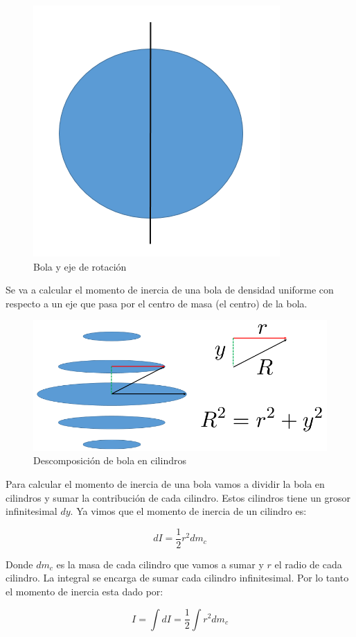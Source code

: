 \documentclass[a4paper,11pt]{article}
\theoremstyle{mytheor}
\begin{document}
\begin{figure}[h]
	\includegraphics[width=0.5\linewidth]{bola1}
	\caption{Bola y eje de rotación}
	\label{fcN4}
\end{figure}

Se va a calcular el momento de inercia de una bola de densidad uniforme con respecto a un eje que pasa por el centro de masa (el centro) de la bola.


\begin{figure}[h]
	\includegraphics[width=1\linewidth]{bola}
	\caption{Descomposición de bola en cilindros}
	\label{fcN4}
\end{figure}

Para calcular el momento de inercia de una bola vamos a dividir la bola en cilindros y sumar la contribución de cada cilindro. Estos cilindros tiene un grosor infinitesimal $dy$. Ya vimos que el momento de inercia de un cilindro es:

$$ dI = \frac{1}{2} r^2 dm_c $$

Donde $dm_c$ es la masa de cada cilindro que vamos a sumar y $r$ el radio de cada cilindro. La integral se encarga de sumar cada cilindro infinitesimal. Por lo tanto el momento de inercia esta dado por:

$$ I = \int d I  = \frac{1}{2}\int r^2 dm_c $$
\end{document}
